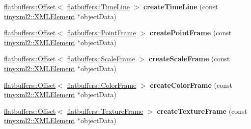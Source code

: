 \begin{DoxyCompactItemize}
\item 
\mbox{\label{classcocostudio_1_1FlatBuffersSerialize_a56ac4f03e5890d615a8100532acd2f5f}} 
\hyperlink{structflatbuffers_1_1Offset}{flatbuffers\+::\+Offset}$<$ \hyperlink{structflatbuffers_1_1TimeLine}{flatbuffers\+::\+Time\+Line} $>$ {\bfseries create\+Time\+Line} (const \hyperlink{classtinyxml2_1_1XMLElement}{tinyxml2\+::\+X\+M\+L\+Element} $\ast$object\+Data)
\item 
\mbox{\label{classcocostudio_1_1FlatBuffersSerialize_ae3b586a0303537826d791189427ab44b}} 
\hyperlink{structflatbuffers_1_1Offset}{flatbuffers\+::\+Offset}$<$ \hyperlink{structflatbuffers_1_1PointFrame}{flatbuffers\+::\+Point\+Frame} $>$ {\bfseries create\+Point\+Frame} (const \hyperlink{classtinyxml2_1_1XMLElement}{tinyxml2\+::\+X\+M\+L\+Element} $\ast$object\+Data)
\item 
\mbox{\label{classcocostudio_1_1FlatBuffersSerialize_a50474b24be841e6559a9b93dc3a57b1d}} 
\hyperlink{structflatbuffers_1_1Offset}{flatbuffers\+::\+Offset}$<$ \hyperlink{structflatbuffers_1_1ScaleFrame}{flatbuffers\+::\+Scale\+Frame} $>$ {\bfseries create\+Scale\+Frame} (const \hyperlink{classtinyxml2_1_1XMLElement}{tinyxml2\+::\+X\+M\+L\+Element} $\ast$object\+Data)
\item 
\mbox{\label{classcocostudio_1_1FlatBuffersSerialize_a89a59933b37e3e7affda6eff170db0a5}} 
\hyperlink{structflatbuffers_1_1Offset}{flatbuffers\+::\+Offset}$<$ \hyperlink{structflatbuffers_1_1ColorFrame}{flatbuffers\+::\+Color\+Frame} $>$ {\bfseries create\+Color\+Frame} (const \hyperlink{classtinyxml2_1_1XMLElement}{tinyxml2\+::\+X\+M\+L\+Element} $\ast$object\+Data)
\item 
\mbox{\label{classcocostudio_1_1FlatBuffersSerialize_a85d080cceb7283f28839ddadd8d52b11}} 
\hyperlink{structflatbuffers_1_1Offset}{flatbuffers\+::\+Offset}$<$ \hyperlink{structflatbuffers_1_1TextureFrame}{flatbuffers\+::\+Texture\+Frame} $>$ {\bfseries create\+Texture\+Frame} (const \hyperlink{classtinyxml2_1_1XMLElement}{tinyxml2\+::\+X\+M\+L\+Element} $\ast$object\+Data)
\item 
\mbox{\label{classcocostudio_1_1FlatBuffersSerialize_aca3774fe60e7a02d0c2274e72b7b7261}} 

\end{DoxyCompactItemize}
